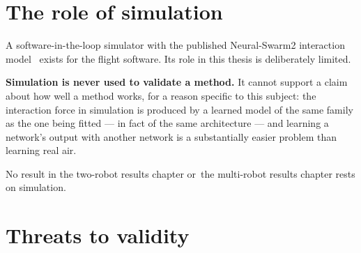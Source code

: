 \section{The role of simulation}
\label{sec:setup-sim}

A software-in-the-loop simulator with the published Neural-Swarm2 interaction
model~\cite{shi2022neuralswarm2} exists for the flight software. Its role in this thesis is
deliberately limited.

\textbf{Simulation is never used to validate a method.} It cannot support a claim about how well a
method works, for a reason specific to this subject: the interaction force in simulation is produced by a learned model
of the same family as the one being fitted --- in fact of the same architecture --- and learning a
network's output with another network is a substantially easier problem than learning real air.

No result in the two-robot results chapter or~the multi-robot results chapter rests on simulation.

\section{Threats to validity}
\label{sec:setup-validity}

